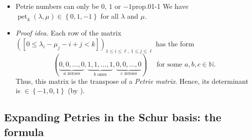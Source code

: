 \documentclass[numbers=enddot,12pt,final,onecolumn,notitlepage]{scrartcl}%
\newcommand{\defn}[1]{{\color{darkred}\emph{#1}}}
\newcommand{\0}{\phantom{c}}
\newcommand{\nowbox}{\hphantom{x} \vspace{-1.5pc}}
\begin{document}
\begin{itemize}
\item \nowbox
\begin{proposition}{Petrie numbers can only be $0$, $1$ or $-1$}{prop.01-1}
We have $\operatorname*{pet}\nolimits_{k}\left(
\lambda,\mu\right)  \in\left\{  0,1,-1\right\}  $ for all $\lambda$ and $\mu$.
\end{proposition}

\item \textit{Proof idea.} Each row of the matrix $\left(  \left[
0\leq\lambda_{i}-\mu_{j}-i+j<k\right]  \right)  _{1\leq i\leq\ell,\ 1\leq
j\leq\ell}$ has the form
\[
(\underbrace{0,0,\ldots,0}_{a\text{ zeroes}},\underbrace{1,1,\ldots
,1}_{b\text{ ones}},\underbrace{0,0,\ldots,0}_{c\text{ zeroes}}%
)\ \ \ \ \ \ \text{for some }a,b,c\in\mathbb{N}.
\]
Thus, this matrix is the transpose of a \defn{Petrie
matrix}. Hence, its determinant is $\in\left\{  -1,0,1\right\}  $ (by
{}).
\end{itemize}

\subsection{Expanding Petries in the Schur basis: the formula}
\end{document}
